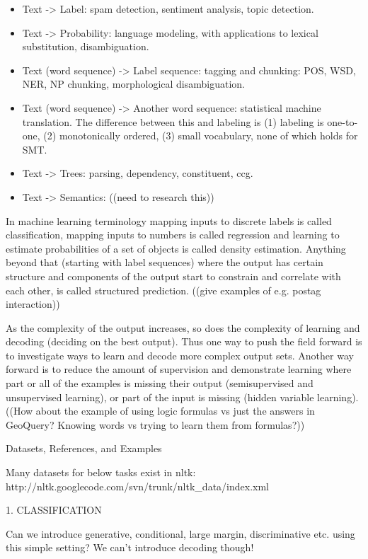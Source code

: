 \documentclass[ignorenonframetext]{beamer}
\begin{document}
\begin{itemize}
\item Text -> Label: spam detection, sentiment analysis, topic
  detection.
\item Text -> Probability: language modeling, with applications to
  lexical substitution, disambiguation.
\item Text (word sequence) -> Label sequence: tagging and chunking:
  POS, WSD, NER, NP chunking, morphological disambiguation.
\item Text (word sequence) -> Another word sequence: statistical
  machine translation.  The difference between this and labeling is
  (1) labeling is one-to-one, (2) monotonically ordered, (3) small
  vocabulary, none of which holds for SMT.
\item Text -> Trees: parsing, dependency, constituent, ccg.
\item Text -> Semantics: ((need to research this))
\end{itemize}

In machine learning terminology mapping inputs to discrete labels is
called classification, mapping inputs to numbers is called regression
and learning to estimate probabilities of a set of objects is called
density estimation.  Anything beyond that (starting with label
sequences) where the output has certain structure and components of
the output start to constrain and correlate with each other, is called
structured prediction.  ((give examples of e.g. postag interaction))

As the complexity of the output increases, so does the complexity of
learning and decoding (deciding on the best output).  Thus one way to
push the field forward is to investigate ways to learn and decode more
complex output sets.  Another way forward is to reduce the amount of
supervision and demonstrate learning where part or all of the examples
is missing their output (semisupervised and unsupervised learning), or
part of the input is missing (hidden variable learning).  ((How about
the example of using logic formulas vs just the answers in GeoQuery?
Knowing words vs trying to learn them from formulas?))


Datasets, References, and Examples

Many datasets for below tasks exist in nltk:
http://nltk.googlecode.com/svn/trunk/nltk_data/index.xml

1. CLASSIFICATION

Can we introduce generative, conditional, large margin, discriminative
etc. using this simple setting?  We can't introduce decoding though!
\end{document}
